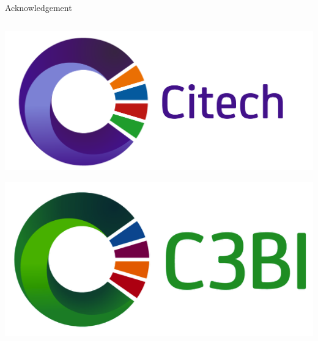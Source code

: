 \documentclass{beamer}
\begin{document}
\begin{frame}{Acknowledgement}
\begin{columns}[t]
\begin{column}{0.5\textwidth}
\begin{itemize}
                    \includegraphics[scale=0.06]{images/citech}

                    \includegraphics[scale=0.25]{images/c3bi}


\end{itemize}
\end{column}
\end{columns}
\end{frame}
\end{document}
